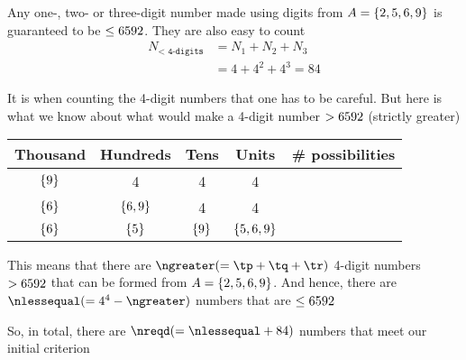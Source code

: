 \begin{solution}[\halfpage]
	Any one-, two- or three-digit number made using digits from $A=\lbrace 2,5,6,9 \rbrace$ 
	is guaranteed to be $\leq 6592$. They are also easy to count
	\begin{align}
		N_{\texttt{< 4-digits}} &= N_1 + N_2 + N_3 \\ 
		 &= 4 + 4^2 + 4^3 = 84
	\end{align}
	
	It is when counting the 4-digit numbers that one has to be careful. But here is what we know about what 
	would make a 4-digit number $ > 6592$ (strictly greater)
	
	
	\begin{tabular}{ccccc}
		\toprule
		Thousand & Hundreds & Tens & Units & \# possibilities \\
		\midrule
		$\lbrace9\rbrace$ & 4 & 4 & 4 & \tp \\ %
		$\lbrace6\rbrace$ & $\lbrace6,9\rbrace$ & 4 & 4 & \tq \\ %
		$\lbrace6\rbrace$ & $\lbrace5\rbrace$ & $\lbrace9\rbrace$ & $\lbrace5,6,9\rbrace$ & \tr \\ %
	    \bottomrule
	\end{tabular}
	
	This means that there are $\ngreater (= \tp + \tq + \tr)$ 4-digit numbers $ > 6592$ that can be formed from 
	$A = \lbrace2,5,6,9\rbrace$. And hence, there are $\nlessequal( = 4^4 - \ngreater)$ numbers that are $ \leq 6592$
	
	So, in total, there are $\nreqd (= \nlessequal + 84)$ numbers that meet our initial criterion
	
\end{solution}
